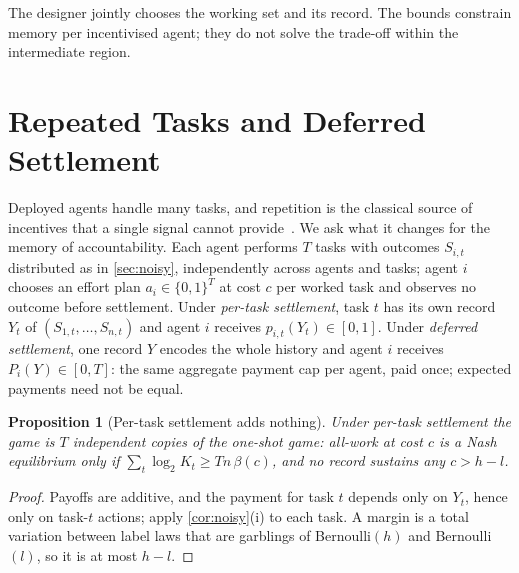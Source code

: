 \documentclass[sigconf,anonymous,acmthm=false]{aamas}
\theoremstyle{acmplain}
\newtheorem{proposition}{Proposition}
\theoremstyle{acmdefinition}
\newcommand{\cube}{\{0,1\}}
\begin{document}
The designer jointly chooses the working set and its record. The bounds constrain memory
per incentivised agent; they do not solve the trade-off within the intermediate region.

\section{Repeated Tasks and Deferred Settlement}\label{sec:repeated}

Deployed agents handle many tasks, and repetition is the classical source of incentives that
a single signal cannot provide~\cite{radner1985repeated,jacksonsonnenschein2007}. We ask what
it changes for the memory of accountability. Each agent performs $T$ tasks with outcomes
$S_{i,t}$ distributed as in \cref{sec:noisy}, independently across agents and tasks; agent $i$
chooses an effort plan $a_i\in\cube^T$ at cost $c$ per worked task and observes no outcome
before settlement. Under \emph{per-task settlement}, task $t$ has its own record $Y_t$ of
$(S_{1,t},\dots,S_{n,t})$ and agent $i$ receives $p_{i,t}(Y_t)\in[0,1]$. Under \emph{deferred
settlement}, one record $Y$ encodes the whole history and agent $i$ receives
$P_i(Y)\in[0,T]$: the same aggregate payment cap per agent, paid once; expected payments need not be equal.

\begin{proposition}[Per-task settlement adds nothing]\label{prop:pertask}
Under per-task settlement the game is $T$ independent copies of the one-shot game: all-work at
cost $c$ is a Nash equilibrium only if $\sum_t\log_2K_t\ge Tn\,\beta(c)$, and no record
sustains any $c>h-l$.
\end{proposition}
\begin{proof}
Payoffs are additive, and the payment for task $t$ depends only on $Y_t$, hence only on
task-$t$ actions; apply \cref{cor:noisy}(i) to each task. A margin is a total variation
between label laws that are garblings of Bernoulli$(h)$ and Bernoulli$(l)$, so it is at most
$h-l$.
\end{proof}
\end{document}
